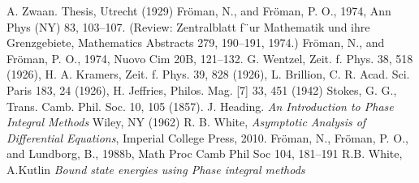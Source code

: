 \documentclass[aps,prl,preprint,superscriptaddress]{revtex4}
\begin{document}
\begin{thebibliography}{10}
 A. Zwaan. Thesis, Utrecht (1929)
 Fr\"oman, N., and Fr\"oman, P. O., 1974, Ann Phys (NY) 83, 103–107. (Review: Zentralblatt
f¨ur Mathematik und ihre Grenzgebiete, Mathematics Abstracts 279, 190–191, 1974.)
 Fr\"oman, N., and Fr\"oman, P. O., 1974, Nuovo Cim 20B, 121–132.
 G. Wentzel, Zeit. f. Phys. 38, 518 (1926), H. A. Kramers,
 Zeit. f. Phys. 39, 828 (1926), L. Brillion, C. R. Acad. Sci. Paris 183, 
24 (1926), H. Jeffries, Philos. Mag. [7] 33, 451 (1942)
 Stokes, G. G., Trans. Camb. Phil. Soc. 10, 105 (1857).
 J. Heading. {\it An Introduction to Phase Integral Methods} 
Wiley, NY (1962)
 R. B. White,
 {\it Asymptotic Analysis of Differential Equations}, Imperial College Press, 2010.
 Fr\"oman, N., Fr\"oman, P. O., and Lundborg, B., 1988b, Math Proc Camb Phil Soc 104, 181–191
 R.B. White, A.Kutlin {\it Bound state energies using Phase integral methods} 
\end{thebibliography}
\end{document}
